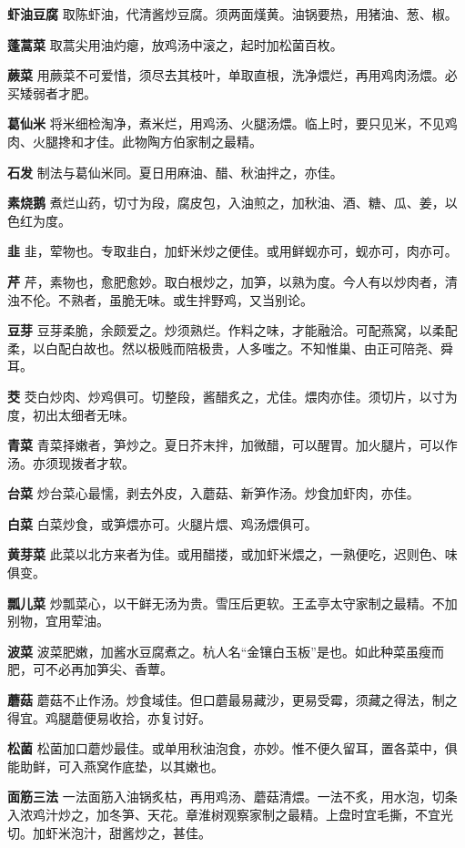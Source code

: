 \documentclass[]{article}
\begin{document}
\textbf{虾油豆腐}
取陈虾油，代清酱炒豆腐。须两面熯黄。油锅要热，用猪油、葱、椒。

\textbf{蓬蒿菜} 取蒿尖用油灼瘪，放鸡汤中滚之，起时加松菌百枚。

\textbf{蕨菜}
用蕨菜不可爱惜，须尽去其枝叶，单取直根，洗净煨烂，再用鸡肉汤煨。必买矮弱者才肥。

\textbf{葛仙米}
将米细检淘净，煮米烂，用鸡汤、火腿汤煨。临上时，要只见米，不见鸡肉、火腿搀和才佳。此物陶方伯家制之最精。

\textbf{石发} 制法与葛仙米同。夏日用麻油、醋、秋油拌之，亦佳。

\textbf{素烧鹅}
煮烂山药，切寸为段，腐皮包，入油煎之，加秋油、酒、糖、瓜、姜，以色红为度。

\textbf{韭}
韭，荤物也。专取韭白，加虾米炒之便佳。或用鲜蚬亦可，蚬亦可，肉亦可。

\textbf{芹}
芹，素物也，愈肥愈妙。取白根炒之，加笋，以熟为度。今人有以炒肉者，清浊不伦。不熟者，虽脆无味。或生拌野鸡，又当别论。

\textbf{豆芽}
豆芽柔脆，余颇爱之。炒须熟烂。作料之味，才能融洽。可配燕窝，以柔配柔，以白配白故也。然以极贱而陪极贵，人多嗤之。不知惟巢、由正可陪尧、舜耳。

\textbf{茭}
茭白炒肉、炒鸡俱可。切整段，酱醋炙之，尤佳。煨肉亦佳。须切片，以寸为度，初出太细者无味。

\textbf{青菜}
青菜择嫩者，笋炒之。夏日芥末拌，加微醋，可以醒胃。加火腿片，可以作汤。亦须现拨者才软。

\textbf{台菜}
炒台菜心最懦，剥去外皮，入蘑菇、新笋作汤。炒食加虾肉，亦佳。

\textbf{白菜} 白菜炒食，或笋煨亦可。火腿片煨、鸡汤煨俱可。

\textbf{黄芽菜}
此菜以北方来者为佳。或用醋搂，或加虾米煨之，一熟便吃，迟则色、味俱变。

\textbf{瓢儿菜}
炒瓢菜心，以干鲜无汤为贵。雪压后更软。王孟亭太守家制之最精。不加别物，宜用荤油。

\textbf{波菜}
波菜肥嫩，加酱水豆腐煮之。杭人名``金镶白玉板''是也。如此种菜虽瘦而肥，可不必再加笋尖、香蕈。

\textbf{蘑菇}
蘑菇不止作汤。炒食域佳。但口蘑最易藏沙，更易受霉，须藏之得法，制之得宜。鸡腿蘑便易收拾，亦复讨好。

\textbf{松菌}
松菌加口蘑炒最佳。或单用秋油泡食，亦妙。惟不便久留耳，置各菜中，俱能助鲜，可入燕窝作底垫，以其嫩也。

\textbf{面筋三法}
一法面筋入油锅炙枯，再用鸡汤、蘑菇清煨。一法不炙，用水泡，切条入浓鸡汁炒之，加冬笋、天花。章淮树观察家制之最精。上盘时宜毛撕，不宜光切。加虾米泡汁，甜酱炒之，甚佳。
\end{document}
